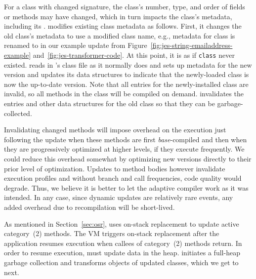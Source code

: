 For a class with changed signature, the class's number, type, and order of
fields or methods may have changed, which in turn impacts the class's
metadata, including its \TIB. \JV modifies existing class metadata as
follows.  First, it changes the old class's metadata to use a modified
class name, e.g., metadata for class \User is renamed to \oUser in our
example update from Figure~\ref{fig:jes-string-emailaddress-example}
and~\ref{fig:jes-transformer-code}. At this point, it is as if {\tt class}
\User never existed. \JV reads in \User's class file as it normally does
and sets up metadata for the new version and updates its data structures
to indicate that the newly-loaded class is now the up-to-date version.
Note that all \TIB entries for the newly-installed class are invalid, so
all methods in the class will be compiled on demand. \JV invalidates the
\TIB entries and other data structures for the old class so that they can
be garbage-collected.

Invalidating changed methods will impose overhead on the execution just
following the update when these methods are first \emph{base}-compiled and
then when they are progressively optimized at higher levels, if they
execute frequently. We could reduce this overhead somewhat by optimizing
new versions directly to their prior level of optimization. Updates to
method bodies however invalidate execution profiles and  without branch and
call frequencies, code quality would degrade. Thus, we believe it is better
to let the adaptive compiler work as it was intended. In any case, since
dynamic updates are relatively rare events, any added overhead due to
recompilation will be short-lived.

As mentioned in Section~\ref{sec:osr}, \JV uses on-stack replacement to
update active category~(2) methods. The VM triggers on-stack replacement
after the application resumes execution when callees of category~(2)
methods return. In order to resume execution, \JV must update data in the
heap. \JV initiates a full-heap garbage collection and transforms objects of
updated classes, which we get to next.
